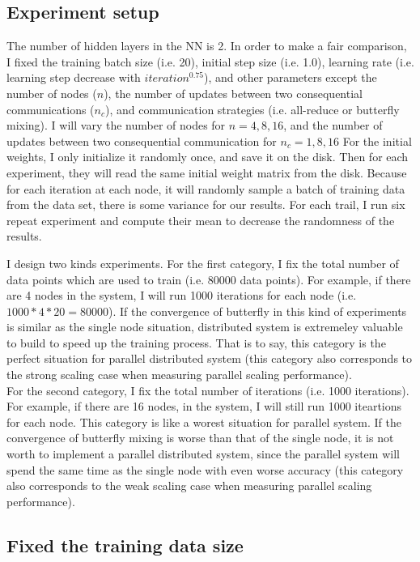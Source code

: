 \documentclass{article}
\begin{document}
\subsection{Experiment setup}
The number of hidden layers in the NN is 2. In order to make a fair comparison, I fixed the training batch size (i.e. 20), initial step size (i.e. 1.0), learning rate (i.e. learning step decrease with $iteration^{0.75}$), and other parameters except the number of nodes ($n$), the number of updates between two consequential communications ($n_c$), and communication strategies (i.e. all-reduce or butterfly mixing). I will vary the number of nodes for $n = 4, 8, 16$, and the number of updates between two consequential communication for $n_c = 1, 8, 16$ For the initial weights, I only initialize it randomly once, and save it on the disk. Then for each experiment, they will read the same initial weight matrix from the disk. Because for each iteration at each node, it will randomly sample a batch of training data from the data set, there is some variance for our results. For each trail, I run six repeat experiment and compute their mean to decrease the randomness of the results. 

I design two kinds experiments. For the first category, I fix the total number of data points which are used to train (i.e. 80000 data points). For example, if there are 4 nodes in the system, I will run 1000 iterations for each node (i.e. $1000*4*20 = 80000$). If the convergence of butterfly in this kind of experiments is similar as the single node situation, distributed system is extremeley valuable to build to speed up the training process. That is to say, this category is the perfect situation for parallel distributed system (this category also corresponds to the strong scaling case when measuring parallel scaling performance).\\

For the second category, I fix the total number of iterations (i.e. 1000 iterations). For example, if there are 16 nodes, in the system, I will still run 1000 iteartions for each node. This category is like a worest situation for parallel system. If the convergence of butterfly mixing is worse than that of the single node, it is not worth to implement a parallel distributed system, since the parallel system will spend the same time as the single node with even worse accuracy (this category also corresponds to the weak scaling case when measuring parallel scaling performance).


\subsection{Fixed the training data size}
\end{document}
